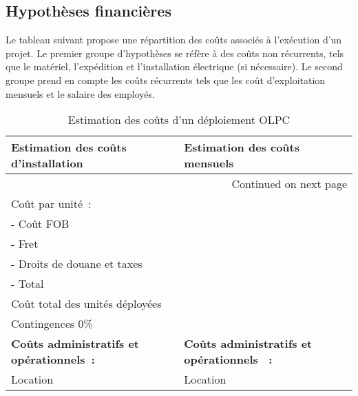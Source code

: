 \documentclass[12pt]{article}
\begin{document}
\subsection{Hypothèses financières}
\label{sec-6-3}



Le tableau suivant propose une répartition des coûts associés à l'exécution
d'un projet. Le premier groupe d'hypothèses se réfère à des coûts non
récurrents, tels que le matériel, l'expédition et l'installation électrique
(si nécessaire). Le second groupe prend en compte les coûts récurrents tels
que les coût d'exploitation mensuels et le salaire des employés.

\begin{longtable}{|l|l|}
\caption{Estimation des coûts d'un déploiement OLPC} \\
\hline
 Estimation des coûts d’installation               &  Estimation des coûts mensuels                     \\
\hline
\endhead
\hline\multicolumn{2}{r}{Continued on next page}\
\endfoot
\endlastfoot
\hline
 \textbf{Coûts généraux :}                         &                                                     \\
 Coût par unité :                                  &                                                     \\
 - Coût FOB                                        &                                                     \\
 - Fret                                            &                                                     \\
 - Droits de douane et taxes                       &                                                     \\
 - Total                                           &                                                     \\
 Coût total des unités déployées                   &                                                     \\
 Contingences 0\%                                  &                                                     \\
\hline
 \textbf{Coûts administratifs et opérationnels :}  &  \textbf{Coûts administratifs et opérationnels  :}  \\
 Location                                          &  Location                                           \\

\end{longtable}
\end{document}
